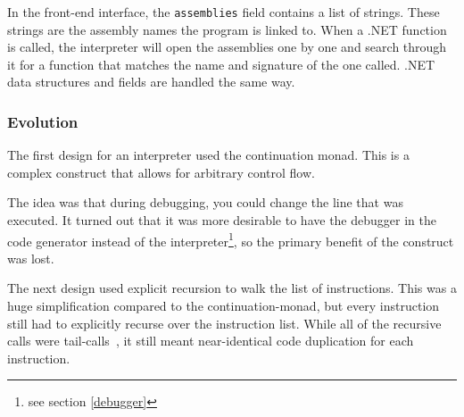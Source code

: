 In the front-end interface, the \verb|assemblies| field contains a list of strings.
These strings are the assembly names the program is linked to.
When a .NET function is called, the interpreter will open the assemblies one by one and search through it for a function that matches the name and signature of the one called.
.NET data structures and fields are handled the same way.

\subsubsection{Evolution}
The first design for an interpreter used the continuation monad.
This is a complex construct that allows for arbitrary control flow.

The idea was that during debugging, you could change the line that was executed.
It turned out that it was more desirable to have the debugger in the code generator instead of the interpreter\footnote{see section \ref{debugger}}, so the primary benefit of the construct was lost.

The next design used explicit recursion to walk the list of instructions.
This was a huge simplification compared to the continuation-monad, but every instruction still had to explicitly recurse over the instruction list.
While all of the recursive calls were tail-calls~\cite{tailcalls}, it still meant near-identical code duplication for each instruction.


